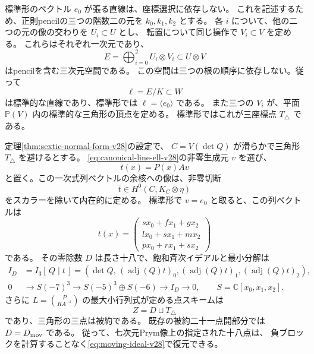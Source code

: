 標準形のベクトル $e_0$ が張る直線は、座標選択に依存しない。
これを記述するため、正則pencilの三つの階数二の元を $k_0,k_1,k_2$ とする。
各 $i$ について、他の二つの元の像の交わりを $U_i\subset U$ とし、
転置について同じ操作で $V_i\subset V$ を定める。
これらはそれぞれ一次元であり、
\[
 E=\bigoplus_{i=0}^2 U_i\otimes V_i\subset U\otimes V
\]
はpencilを含む三次元空間である。
この空間は三つの根の順序に依存しない。従って
\begin{equation}\label{eq:canonical-line-ell-v28}
 \ell=E/K\subset W
\end{equation}
は標準的な直線であり、標準形では $\ell=\langle e_0\rangle$ である。
また三つの $V_i$ が、平面 $\mathbb P(V)$ 内の標準的な三角形の頂点を定める。
標準形ではこれが三座標点 $T_\triangle$ である。

\begin{theorem}
\label{thm:canonical-moving-section-v28}
定理\ref{thm:sextic-normal-form-v28}の設定で、
$C=V(\det Q)$ が滑らかで三角形 $T_\triangle$ を避けるとする。
\eqref{eq:canonical-line-ell-v28}の非零生成元 $v$ を選び、
\[
 t(x)=P(x)Av
\]
と置く。この一次式列ベクトルの余核への像は、非零切断
\[
 \bar t\in H^0(C,K_C\otimes\eta)
\]
をスカラーを除いて内在的に定める。
標準形で $v=e_0$ と取ると、この列ベクトルは
\[
 t(x)=\begin{pmatrix}
 sx_0+fx_1+gx_2\\ lx_0+sx_1+mx_2\\ px_0+rx_1+sx_2
 \end{pmatrix}
\]
である。
その零除数 $D$ は長さ十八で、飽和斉次イデアルと最小分解は
\begin{align}
 I_D&=I_3[\,Q\mid t\,]
      =(\det Q,\, (\operatorname{adj}(Q)t)_0,
                    (\operatorname{adj}(Q)t)_1,
                    (\operatorname{adj}(Q)t)_2),
 \label{eq:moving-ideal-v28}\\
 0&\longrightarrow S(-7)^3
 \longrightarrow S(-5)^3\oplus S(-6)
 \longrightarrow I_D\longrightarrow0,
 \qquad S=\mathbb C[x_0,x_1,x_2].
 \label{eq:moving-HB-v28}
\end{align}
さらに $L=\binom{P}{RA^{-1}}$ の最大小行列式が定める点スキームは
\[
 Z=D\sqcup T_\triangle
\]
であり、三角形の三点は被約である。
既存の被約二十一点開部分では $D=D_{\rm mov}$ である。
従って、七次元Prym像上の指定された十八点は、
負ブロックを計算することなく\eqref{eq:moving-ideal-v28}で復元できる。
\end{theorem}

